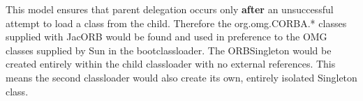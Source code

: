 This model ensures that parent delegation occurs only \textbf{after} an unsuccessful attempt to load a class from
the child. Therefore the org.omg.CORBA.* classes supplied with JacORB would be found and used in preference to
the OMG classes supplied by Sun in the bootclassloader. The ORBSingleton would be created entirely within the
child classloader with no external references. This means the second classloader would also create its own,
entirely isolated Singleton class.
